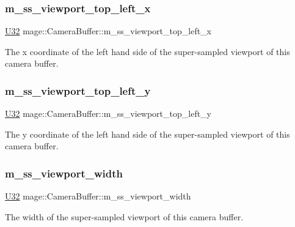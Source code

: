 \subsubsection{\texorpdfstring{m\+\_\+ss\+\_\+viewport\+\_\+top\+\_\+left\+\_\+x}{m\_ss\_viewport\_top\_left\_x}}
{\footnotesize\ttfamily \hyperlink{namespacemage_a41c104c036fba3756a74e19f793eeaa1}{U32} mage\+::\+Camera\+Buffer\+::m\+\_\+ss\+\_\+viewport\+\_\+top\+\_\+left\+\_\+x}

The x coordinate of the left hand side of the super-\/sampled viewport of this camera buffer. \hypertarget{structmage_1_1_camera_buffer_ac6c5a7af84cef485dd9ddacd018e4a82}{}\label{structmage_1_1_camera_buffer_ac6c5a7af84cef485dd9ddacd018e4a82} 
\subsubsection{\texorpdfstring{m\+\_\+ss\+\_\+viewport\+\_\+top\+\_\+left\+\_\+y}{m\_ss\_viewport\_top\_left\_y}}
{\footnotesize\ttfamily \hyperlink{namespacemage_a41c104c036fba3756a74e19f793eeaa1}{U32} mage\+::\+Camera\+Buffer\+::m\+\_\+ss\+\_\+viewport\+\_\+top\+\_\+left\+\_\+y}

The y coordinate of the left hand side of the super-\/sampled viewport of this camera buffer. \hypertarget{structmage_1_1_camera_buffer_af7a4718829dc96716c4861bbe00bb7e0}{}\label{structmage_1_1_camera_buffer_af7a4718829dc96716c4861bbe00bb7e0} 
\subsubsection{\texorpdfstring{m\+\_\+ss\+\_\+viewport\+\_\+width}{m\_ss\_viewport\_width}}
{\footnotesize\ttfamily \hyperlink{namespacemage_a41c104c036fba3756a74e19f793eeaa1}{U32} mage\+::\+Camera\+Buffer\+::m\+\_\+ss\+\_\+viewport\+\_\+width}

The width of the super-\/sampled viewport of this camera buffer. \hypertarget{structmage_1_1_camera_buffer_aa23d2ecaed10960832215c2397884421}{}\label{structmage_1_1_camera_buffer_aa23d2ecaed10960832215c2397884421} 
